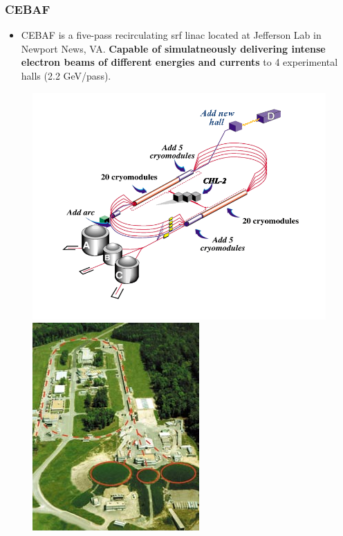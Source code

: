\documentclass{beamer}
\begin{document}
\begin{frame}
\frametitle{CEBAF}
\begin{itemize}
\item CEBAF is a five-pass recirculating srf linac located at Jefferson Lab in Newport News, VA. \textbf{Capable of simulatneously delivering intense electron beams of different energies and currents} to 4 experimental halls (2.2 GeV/pass).
\end{itemize}
\begin{figure}
\includegraphics[width=0.65\linewidth]{figs/CEBAF.png}
\includegraphics[width=0.35\linewidth]{figs/CEBAF2.jpg}
\end{figure}

\end{frame}

\end{document}

